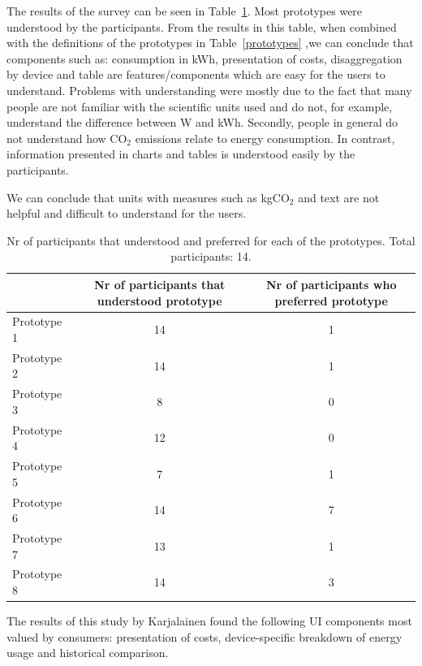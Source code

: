 \documentclass[journal]{vgtc}                %
\begin{document}
The results of the survey can be seen in Table~\ref{prototypesresults}. Most prototypes were understood by the participants. From the results in this table, when combined with the definitions of the prototypes in Table~\ref{prototypes} ,we can conclude that components such as: consumption in kWh, presentation of costs, disaggregation by device and table are features/components which are easy for the users to understand. Problems with understanding were mostly due to the fact that many people are not familiar with the scientific units used and do not, for example, understand the difference between W and kWh. Secondly, people in general do not understand how CO$_2$ emissions relate to energy consumption.
In contrast, information presented in charts and tables is understood easily by the participants.

We can conclude that units with measures such as kgCO$_2$ and text are not helpful and difficult to understand for the users.


\begin{table}
  \caption{Nr of participants that understood and preferred for each of the prototypes. Total participants: 14. \cite{karjalainen2011consumer}}
  \label{prototypesresults}
  \scriptsize
  \begin{center}
    \begin{tabular}{|lcc|}
    \hline
       & \multicolumn{1}{p{2.5cm}}{\centering Nr of participants that understood prototype} & 
       \multicolumn{1}{p{3cm}|}{\centering Nr of participants who preferred prototype}  \\ \hline
       Prototype 1 & 14 & 1 \\ 
       Prototype 2 & 14 & 1 \\ 
       Prototype 3 & 8 & 0 \\ 
       Prototype 4 & 12 & 0 \\ 
       Prototype 5 & 7 & 1 \\ 
       Prototype 6 & 14 & 7 \\ 
       Prototype 7 & 13 & 1 \\ 
       Prototype 8 & 14 & 3 \\ \hline
    \end{tabular}
  \end{center}
\end{table}

The results of this study by Karjalainen found the following UI components most valued by consumers: presentation of costs, device-specific breakdown of energy usage and historical comparison.  %
\end{document}
